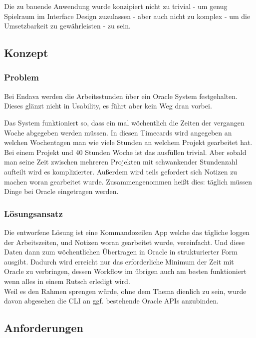 \documentclass[oneside,bibliography=totocnumbered,BCOR=5mm]{scrbook}
\begin{document}
Die zu bauende Anwendung wurde konzipiert nicht zu trivial - um genug
Spielraum im Interface Design zuzulassen - aber auch nicht zu komplex - um die
Umsetzbarkeit zu gewährleisten - zu sein.

\subsection{Konzept}
\subsubsection{Problem}

Bei Endava werden die Arbeitsstunden über ein Oracle System festgehalten. Dieses
glänzt nicht in Usability, es führt aber kein Weg dran vorbei.


Das System funktioniert so, dass ein mal wöchentlich die Zeiten der vergangen
Woche abgegeben werden müssen. In diesen Timecards wird angegeben an welchen
Wochentagen man wie viele Stunden an welchem Projekt gearbeitet hat. Bei einem
Projekt und 40 Stunden Woche ist das ausfüllen trivial. Aber sobald man seine
Zeit zwischen mehreren Projekten mit schwankender Stundenzahl aufteilt wird
es komplizierter. Außerdem wird teils gefordert sich Notizen zu machen woran
gearbeitet wurde. Zusammengenommen heißt dies: täglich müssen Dinge bei Oracle
eingetragen werden.


\subsubsection{Lösungsansatz}

Die entworfene Lösung ist eine Kommandozeilen App welche das tägliche loggen der
Arbeitszeiten, und Notizen woran gearbeitet wurde, vereinfacht. Und diese Daten
dann zum wöchentlichen Übertragen in Oracle in strukturierter Form ausgibt.
Dadurch wird erreicht nur das erforderliche Minimum der Zeit mit Oracle zu
verbringen, dessen Workflow im übrigen auch am besten funktioniert wenn alles in
einem Rutsch erledigt wird.
\\
Weil es den Rahmen sprengen würde, ohne dem Thema dienlich zu sein, wurde davon
abgesehen die CLI an ggf. bestehende Oracle APIs anzubinden.

\subsection{Anforderungen}
\end{document}
